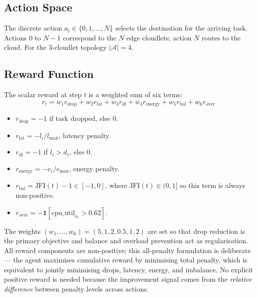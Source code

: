 \subsection{Action Space}

The discrete action $a_t \in \{0, 1, \ldots, N\}$ selects the
destination for the arriving task. Actions $0$ to $N{-}1$
correspond to the $N$ edge cloudlets; action $N$ routes to the
cloud. For the 3-cloudlet topology $|\mathcal{A}| = 4$.

\subsection{Reward Function}

The scalar reward at step $t$ is a weighted sum of six terms:
\begin{equation}
  r_t = w_1 r_{\text{drop}} + w_2 r_{\text{lat}}
      + w_3 r_{\text{dl}}   + w_4 r_{\text{energy}}
      + w_5 r_{\text{bal}}  + w_6 r_{\text{over}}
  \label{eq:reward_method}
\end{equation}

\begin{itemize}
  \item $r_{\text{drop}} = -1$ if task dropped, else $0$.
  \item $r_{\text{lat}} = -l_i / l_{\max}$, latency penalty.
  \item $r_{\text{dl}} = -1$ if $l_i > d_\tau$, else $0$.
  \item $r_{\text{energy}} = -e_i / e_{\max}$, energy penalty.
  \item $r_{\text{bal}} = \text{JFI}(t) - 1 \in [-1, 0]$,
  where $\text{JFI}(t) \in (0, 1]$ so this term is always
  non-positive.
  \item $r_{\text{over}} = -\mathbf{1}[\text{cpu\_util}_{a_t} > 0.62]$.
\end{itemize}

The weights $(w_1, \ldots, w_6) = (5, 1, 2, 0.5, 1, 2)$ are set
so that drop reduction is the primary objective and balance and
overload prevention act as regularisation. All reward components
are non-positive; this all-penalty formulation is deliberate —
the agent maximises cumulative reward by minimising total
penalty, which is equivalent to jointly minimising drops,
latency, energy, and imbalance. No explicit positive reward
is needed because the improvement signal comes from the
\emph{relative difference} between penalty levels across actions.

